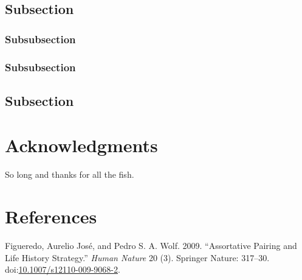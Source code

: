 \documentclass[fleqn,10pt,lineno]{wlpeerj} %
\begin{document}
\lipsum[10] 

\subsection*{Subsection}\label{subsection-2}

\lipsum[11] 

\subsubsection*{Subsubsection}\label{subsubsection}

\lipsum[12] 

\subsubsection*{Subsubsection}\label{subsubsection-1}

\lipsum[14] 

\subsection*{Subsection}\label{subsection-3}

\lipsum[15-20] 

\section*{Acknowledgments}\label{acknowledgments}

So long and thanks for all the fish.

\section*{References}\label{references}

\hypertarget{refs}{}
\hypertarget{ref-Figueredo:2009dg}{}
Figueredo, Aurelio José, and Pedro S. A. Wolf. 2009. ``Assortative
Pairing and Life History Strategy.'' \emph{Human Nature} 20 (3).
Springer Nature: 317--30.
doi:\href{https://doi.org/10.1007/s12110-009-9068-2}{10.1007/s12110-009-9068-2}.
\end{document}
